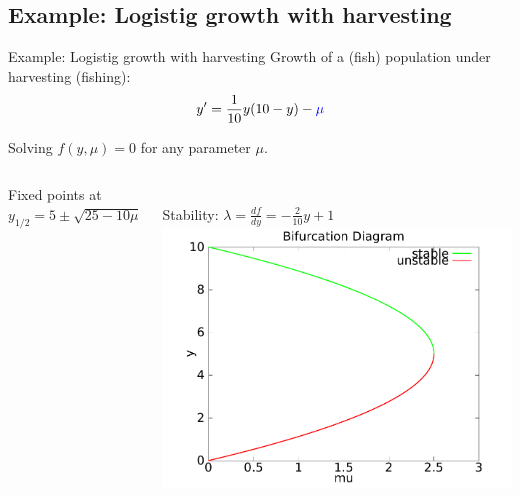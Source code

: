 \documentclass{beamer}
\begin{document}
\subsection{Example: Logistig growth with harvesting}
\begin{frame}{Example: Logistig growth with harvesting}
    Growth of a (fish) population under harvesting (fishing):
    $$y' = \frac{1}{10}y(10 - y) - \textcolor{blue}{\mu} $$

    Solving $f(y,\mu) = 0$ for any parameter $\mu$. 
     \pause
     \begin{columns}
            Fixed points at $y_{1/2} = 5 \pm \sqrt{25 - 10 \mu}$
            
            ~\\
            
            Stability: $\lambda = \frac{df}{dy} = -\frac{2}{10} y + 1$
            \includegraphics[width=1\textwidth]{grafik/harvesting}
    \end{columns}
\end{frame}

\end{document}
